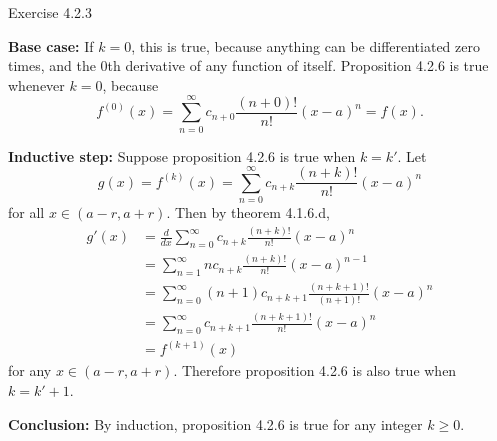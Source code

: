 \documentclass{article}
\begin{document}
\bigskip
\begin{prob}
    Exercise 4.2.3
\end{prob}
\textbf{Base case:} If $k=0$, this is true, because anything can be differentiated zero times, and the 0th derivative of any function of itself. Proposition 4.2.6 is true whenever $k=0$, because
\[ f^{(0)}(x) = \sum_{n=0}^\infty c_{n+0} \frac{(n+0)!}{n!} (x-a)^n = f(x). \]
\par
\textbf{Inductive step:} Suppose proposition 4.2.6 is true when $k=k'$. Let
\[ g(x) = f^{(k)}(x)=\sum_{n=0}^\infty c_{n+k} \frac{(n+k)!}{n!} (x-a)^n \]
for all $x \in (a-r, a+r)$. Then by theorem 4.1.6.d,
\begin{align*}
    g'(x) &= \frac{d}{dx} \sum_{n=0}^\infty c_{n+k} \frac{(n+k)!}{n!} (x-a)^n \\
          &= \sum_{n=1}^\infty n c_{n+k} \frac{(n+k)!}{n!} (x-a)^{n-1} \\
          &= \sum_{n=0}^\infty (n+1) c_{n+k+1} \frac{(n+k+1)!}{(n+1)!} (x-a)^n \\
          &= \sum_{n=0}^\infty c_{n+k+1} \frac{(n+k+1)!}{n!} (x-a)^n \\
          &= f^{(k+1)}(x)
\end{align*}
for any $x \in (a-r, a+r)$. Therefore proposition 4.2.6 is also true when $k=k'+1$.
\par
\textbf{Conclusion:} By induction, proposition 4.2.6 is true for any integer $k \geq 0$.


\end{document}
